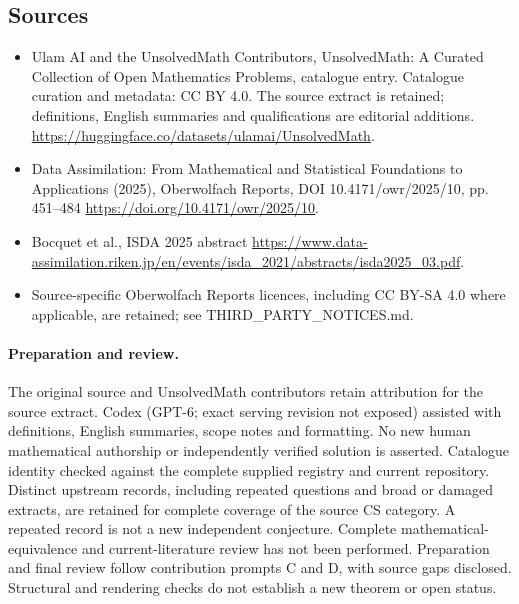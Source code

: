 \documentclass[11pt]{article}
\begin{document}
\subsection{Sources}
\begin{itemize}
\item[\hypertarget{source:statement:1}{S1}] Ulam AI and the UnsolvedMath Contributors, UnsolvedMath: A Curated Collection of Open Mathematics Problems, catalogue entry. Catalogue curation and metadata: CC BY 4.0. The source extract is retained; definitions, English summaries and qualifications are editorial additions.
\url{https://huggingface.co/datasets/ulamai/UnsolvedMath}.
\item[\hypertarget{source:statement:2}{S2}] Data Assimilation: From Mathematical and Statistical Foundations to Applications (2025), Oberwolfach Reports, DOI 10.4171/owr/2025/10, pp. 451--484
\url{https://doi.org/10.4171/owr/2025/10}.
\item[\hypertarget{source:statement:3}{S3}] Bocquet et al., ISDA 2025 abstract
\url{https://www.data-assimilation.riken.jp/en/events/isda_2021/abstracts/isda2025_03.pdf}.
\item Source-specific Oberwolfach Reports licences, including CC BY-SA 4.0 where applicable, are retained; see THIRD\_PARTY\_NOTICES.md.
\end{itemize}
\paragraph{Preparation and review.}
The original source and UnsolvedMath contributors retain attribution for the source extract. Codex (GPT-6; exact serving revision not exposed) assisted with definitions, English summaries, scope notes and formatting. No new human mathematical authorship or independently verified solution is asserted. Catalogue identity checked against the complete supplied registry and current repository. Distinct upstream records, including repeated questions and broad or damaged extracts, are retained for complete coverage of the source CS category. A repeated record is not a new independent conjecture. Complete mathematical-equivalence and current-literature review has not been performed. Preparation and final review follow contribution prompts C and D, with source gaps disclosed. Structural and rendering checks do not establish a new theorem or open status.
\label{end:statement}
\end{document}

